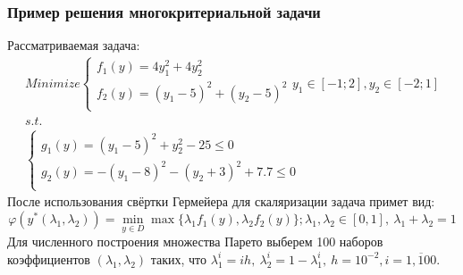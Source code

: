 \documentclass[aspectratio=1610]{beamer}
\begin{document}
\begin{frame}
  \frametitle{Пример решения многокритериальной задачи}
  Рассматриваемая задача:
  \begin{displaymath}
    \begin{array}{l}
        Minimize \left \{
        \begin{array}{l}
          f_1(y) = 4 y_1^2 + 4 y_2^2 \\
          f_2(y) = (y_1-5)^2 + (y_2-5)^2 \\
        \end{array}
        \right .
        y_1\in [-1;2],y_2\in [-2;1]
        \\s.t.
        \\
        \left \{
        \begin{array}{l}
          g_1(y) = (y_1 - 5)^2 + y_2^2 - 25 \leqslant 0 \\
          g_2(y) = -(y_1 - 8)^2 - (y_2 + 3)^2 + 7.7 \leqslant 0\\
        \end{array}
        \right .
    \end{array}
  \end{displaymath}
  После использования свёртки Гермейера для скаляризации задача примет вид:
  \begin{displaymath}
    \varphi(y^*(\lambda_1,\lambda_2))=\min_{y\in D}\max\{\lambda_1 f_1(y), \lambda_2 f_2(y)\};\lambda_1,\lambda_2\in[0,1],\: \lambda_1+\lambda_2=1
\end{displaymath}
Для численного построения множества Парето выберем
100 наборов коэффициентов \((\lambda_1,\lambda_2)\) таких, что
\(\lambda_1^i=i h,\: \lambda_2^i=1-\lambda_1^i,\: h=10^{-2},i=\overline{1, 100}\).
\end{frame}
\end{document}
